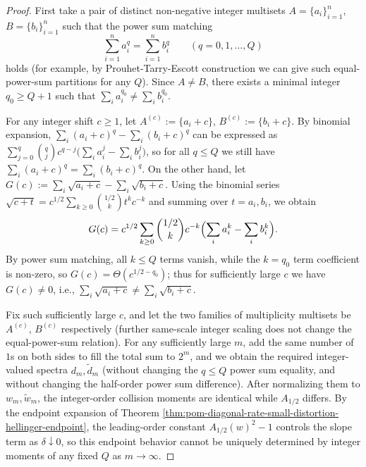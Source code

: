 \begin{proof}
First take a pair of distinct non-negative integer multisets \(A=\{a_i\}_{i=1}^n\), \(B=\{b_i\}_{i=1}^n\) such that the power sum matching
\[
\sum_{i=1}^n a_i^q=\sum_{i=1}^n b_i^q\qquad(q=0,1,\dots,Q)
\]
holds (for example, by Prouhet-Tarry-Escott construction we can give such equal-power-sum partitions for any \(Q\)).
Since \(A\neq B\), there exists a minimal integer \(q_0\ge Q+1\) such that \(\sum_i a_i^{q_0}\ne \sum_i b_i^{q_0}\).
\par
For any integer shift \(c\ge 1\), let \(A^{(c)}:=\{a_i+c\}\), \(B^{(c)}:=\{b_i+c\}\).
By binomial expansion,
\(
\sum_i (a_i+c)^q-\sum_i (b_i+c)^q
\)
can be expressed as \(\sum_{j=0}^q \binom{q}{j}c^{q-j}\bigl(\sum_i a_i^j-\sum_i b_i^j\bigr)\),
so for all \(q\le Q\) we still have \(\sum_i (a_i+c)^q=\sum_i (b_i+c)^q\).
On the other hand, let
\(
G(c):=\sum_i \sqrt{a_i+c}-\sum_i \sqrt{b_i+c}
\).
Using the binomial series
\(
\sqrt{c+t}=c^{1/2}\sum_{k\ge 0}\binom{1/2}{k}t^k c^{-k}
\)
and summing over \(t=a_i,b_i\), we obtain
\[
G(c)
=c^{1/2}\sum_{k\ge 0}\binom{1/2}{k}c^{-k}\Bigl(\sum_i a_i^k-\sum_i b_i^k\Bigr).
\]
By power sum matching, all \(k\le Q\) terms vanish, while the \(k=q_0\) term coefficient is non-zero, so \(G(c)=\Theta(c^{1/2-q_0})\);
thus for sufficiently large \(c\) we have \(G(c)\ne 0\), i.e., \(\sum_i \sqrt{a_i+c}\ne \sum_i \sqrt{b_i+c}\).
\par
Fix such sufficiently large \(c\), and let the two families of multiplicity multisets be \(A^{(c)}\), \(B^{(c)}\) respectively (further same-scale integer scaling does not change the equal-power-sum relation).
For any sufficiently large \(m\), add the same number of \(1\)s on both sides to fill the total sum to \(2^m\), and we obtain the required integer-valued spectra \(d_m,\widetilde d_m\) (without changing the \(q\le Q\) power sum equality, and without changing the half-order power sum difference).
After normalizing them to \(w_m,\widetilde w_m\), the integer-order collision moments are identical while \(A_{1/2}\) differs.
By the endpoint expansion of Theorem \ref{thm:pom-diagonal-rate-small-distortion-hellinger-endpoint}, the leading-order constant \(A_{1/2}(w)^2-1\) controls the slope term as \(\delta\downarrow 0\), so this endpoint behavior cannot be uniquely determined by integer moments of any fixed \(Q\) as \(m\to\infty\).
\end{proof}

